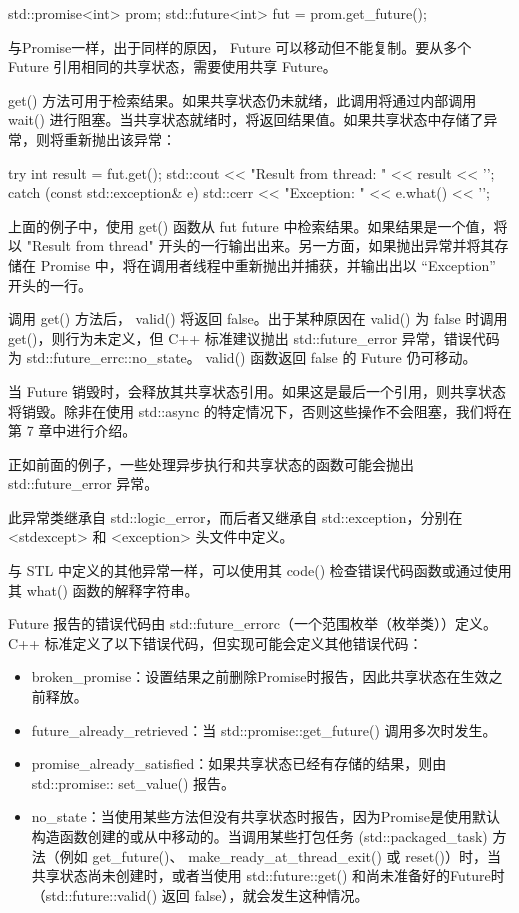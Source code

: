 \begin{cpp}
std::promise<int> prom;
std::future<int> fut = prom.get_future();
\end{cpp}

与Promise一样，出于同样的原因， Future 可以移动但不能复制。要从多个 Future 引用相同的共享状态，需要使用共享 Future。

get() 方法可用于检索结果。如果共享状态仍未就绪，此调用将通过内部调用 wait() 进行阻塞。当共享状态就绪时，将返回结果值。如果共享状态中存储了异常，则将重新抛出该异常：

\begin{cpp}
try {
    int result = fut.get();
    std::cout << "Result from thread: " << result << '\n';
} catch (const std::exception& e) {
    std::cerr << "Exception: " << e.what() << '\n';
}
\end{cpp}

上面的例子中，使用 get() 函数从 fut future 中检索结果。如果结果是一个值，将以 "Result from thread" 开头的一行输出出来。另一方面，如果抛出异常并将其存储在 Promise 中，将在调用者线程中重新抛出并捕获，并输出出以 “Exception” 开头的一行。

调用 get() 方法后， valid() 将返回 false。出于某种原因在 valid() 为 false 时调用 get()，则行为未定义，但 C++ 标准建议抛出 std::future\_error 异常，错误代码为 std::future\_errc::no\_state。 valid() 函数返回 false 的 Future 仍可移动。

当 Future 销毁时，会释放其共享状态引用。如果这是最后一个引用，则共享状态将销毁。除非在使用 std::async 的特定情况下，否则这些操作不会阻塞，我们将在第 7 章中进行介绍。


正如前面的例子，一些处理异步执行和共享状态的函数可能会抛出 std::future\_error 异常。

此异常类继承自 std::logic\_error，而后者又继承自 std::exception，分别在 <stdexcept> 和 <exception> 头文件中定义。

与 STL 中定义的其他异常一样，可以使用其 code() 检查错误代码函数或通过使用其 what() 函数的解释字符串。

Future 报告的错误代码由 std::future\_errorc（一个范围枚举（枚举类））定义。 C++ 标准定义了以下错误代码，但实现可能会定义其他错误代码：

\begin{itemize}
\item
broken\_promise：设置结果之前删除Promise时报告，因此共享状态在生效之前释放。

\item
future\_already\_retrieved：当 std::promise::get\_future() 调用多次时发生。

\item
promise\_already\_satisfied：如果共享状态已经有存储的结果，则由 std::promise:: set\_value() 报告。

\item
no\_state：当使用某些方法但没有共享状态时报告，因为Promise是使用默认构造函数创建的或从中移动的。当调用某些打包任务 (std::packaged\_task) 方法（例如 get\_future()、 make\_ready\_at\_thread\_exit() 或 reset()）时，当共享状态尚未创建时，或者当使用 std::future::get() 和尚未准备好的Future时（std::future::valid() 返回 false），就会发生这种情况。
\end{itemize}

